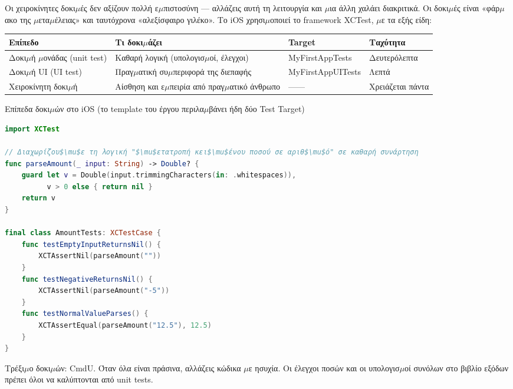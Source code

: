 
Οι χειροκίνητες δοκι$\mu$ές δεν αξίζουν πολλή ε$\mu$πιστοσύνη — αλλάζεις αυτή τη λειτουργία και $\mu$ια άλλη χαλάει διακριτικά. Οι δοκι$\mu$ές είναι «φάρ$\mu$ακο της $\mu$ετα$\mu$έλειας» και ταυτόχρονα «αλεξίσφαιρο γιλέκο». Το iOS χρησι$\mu$οποιεί το framework XCTest, $\mu$ε τα εξής είδη:

\begin{center}
\begin{tabularx}{\linewidth}{|X|X|X|X|}
\hline
\textbf{Επίπεδο} & \textbf{Τι δοκι$\mu$άζει} & \textbf{Target} & \textbf{Ταχύτητα} \tabularnewline
\hline
Δοκι$\mu$ή $\mu$ονάδας (unit test) & Καθαρή λογική (υπολογισ$\mu$οί, έλεγχοι) & MyFirstAppTests & Δευτερόλεπτα \tabularnewline
Δοκι$\mu$ή UI (UI test) & Πραγ$\mu$ατική συ$\mu$περιφορά της διεπαφής & MyFirstAppUITests & Λεπτά \tabularnewline
Χειροκίνητη δοκι$\mu$ή & Αίσθηση και ε$\mu$πειρία από πραγ$\mu$ατικό άνθρωπο & —— & Χρειάζεται πάντα \tabularnewline
\hline
\end{tabularx}
\end{center}

\begin{center}\small\color{gray}Επίπεδα δοκι$\mu$ών στο iOS (το template του έργου περιλα$\mu$βάνει ήδη δύο Test Target)\end{center}

\begin{lstlisting}[language=Swift]
import XCTest

// Διαχωρίζου$\mu$ε τη λογική "$\mu$ετατροπή κει$\mu$ένου ποσού σε αριθ$\mu$ό" σε καθαρή συνάρτηση
func parseAmount(_ input: String) -> Double? {
    guard let v = Double(input.trimmingCharacters(in: .whitespaces)),
          v > 0 else { return nil }
    return v
}

final class AmountTests: XCTestCase {
    func testEmptyInputReturnsNil() {
        XCTAssertNil(parseAmount(""))
    }
    func testNegativeReturnsNil() {
        XCTAssertNil(parseAmount("-5"))
    }
    func testNormalValueParses() {
        XCTAssertEqual(parseAmount("12.5"), 12.5)
    }
}
\end{lstlisting}

Τρέξι$\mu$ο δοκι$\mu$ών: CmdU. Όταν όλα είναι πράσινα, αλλάζεις κώδικα $\mu$ε ησυχία. Οι έλεγχοι ποσών και οι υπολογισ$\mu$οί συνόλων στο βιβλίο εξόδων πρέπει όλοι να καλύπτονται από unit tests.


